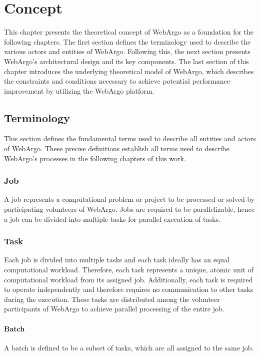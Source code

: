 \chapter{Concept}
\label{ch:concept}
This chapter presents the theoretical concept of WebArgo as a foundation for the following chapters. The first section defines the terminology used to describe the various actors and entities of WebArgo. Following this, the next section presents WebArgo's architectural design and its key components. The last section of this chapter introduces the underlying theoretical model of WebArgo, which describes the constraints and conditions necessary to achieve potential performance improvement by utilizing the WebArgo platform.

\section{Terminology}
\label{sec:concept:terminology}
This section defines the fundamental terms used to describe all entities and actors of WebArgo. These precise definitions establish all terms used to describe WebArgo's processes in the following chapters of this work.

\subsection{Job}
\label{subsec:concept:job}
A job represents a computational problem or project to be processed or solved by participating volunteers of WebArgo. Jobs are required to be parallelizable, hence a job can be divided into multiple tasks for parallel execution of tasks.

\subsection{Task}
\label{subsec:concept:task}
Each job is divided into multiple tasks and each task ideally has an equal computational workload. Therefore, each task represents a unique, atomic unit of computational workload from its assigned job. Additionally, each task is required to operate independently and therefore requires no communication to other tasks during the execution. These tasks are distributed among the volunteer participants of WebArgo to achieve parallel processing of the entire job.

\subsubsection{Batch}
\label{ssubsec:concept:batch}
A batch is defined to be a subset of tasks, which are all assigned to the same job.

